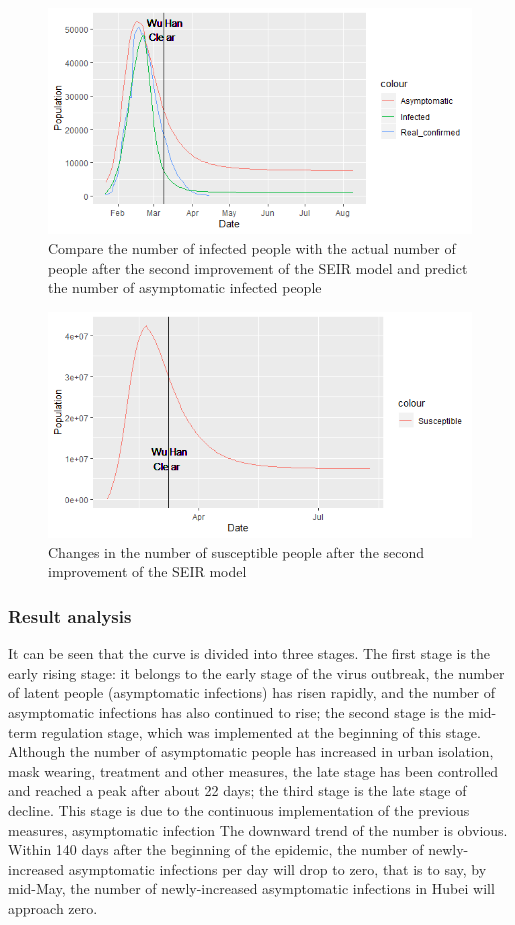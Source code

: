 \documentclass[a4paper, 11pt,twoside=true]{scrartcl}
\begin{document}
\begin{figure}[H]
	\small
	\centering
	\includegraphics[width=16.5cm]{P3F8}
	\caption{Compare the number of infected people with the actual number of people after the second improvement of the SEIR model and predict the number of asymptomatic infected people} \label{P3F8}
\end{figure}

\begin{figure}[H]
	\small
	\centering
	\includegraphics[width=13cm]{P3F9}
	\caption{Changes in the number of susceptible people after the second improvement of the SEIR model} \label{P3F9}%
\end{figure}

\subsubsection{Result analysis}
\qquad It can be seen that the curve is divided into three stages. The first stage is the early rising stage: it belongs to the early stage of the virus outbreak, the number of latent people (asymptomatic infections) has risen rapidly, and the number of asymptomatic infections has also continued to rise; the second stage is the mid-term regulation stage, which was implemented at the beginning of this stage. Although the number of asymptomatic people has increased in urban isolation, mask wearing, treatment and other measures, the late stage has been controlled and reached a peak after about 22 days; the third stage is the late stage of decline. This stage is due to the continuous implementation of the previous measures, asymptomatic infection The downward trend of the number is obvious. Within 140 days after the beginning of the epidemic, the number of newly-increased asymptomatic infections per day will drop to zero, that is to say, by mid-May, the number of newly-increased asymptomatic infections in Hubei will approach zero.
\end{document}
